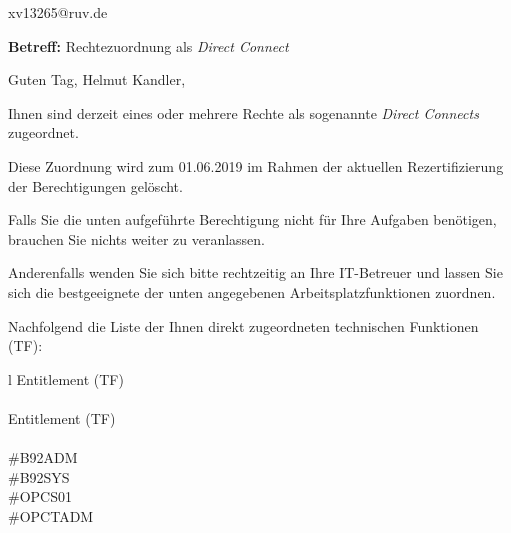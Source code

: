 \documentclass[a4paper,landscape,12pt]{letter}
\begin{document}
\begin{letter}{xv13265@ruv.de\hfill \break}
\begin{normalsize}
	\opening{\textbf{Betreff:} Rechtezuordnung als \emph{Direct Connect}}
	\begin{normalsize} \hfill
	\end{normalsize}

	\begin{normalsize}
		Guten Tag, 
	Helmut Kandler, \hfill \break
	\end{normalsize}
	\end{normalsize}
	
\begin{normalsize}
	Ihnen sind derzeit eines oder mehrere Rechte als sogenannte \emph{Direct Connects} zugeordnet.
	
	Diese Zuordnung wird zum 01.06.2019 im Rahmen der aktuellen Rezertifizierung der Berechtigungen gelöscht.
	
	Falls Sie die unten aufgeführte Berechtigung nicht für Ihre Aufgaben benötigen, 
	brauchen Sie nichts weiter zu veranlassen.
	
	Anderenfalls wenden Sie sich bitte rechtzeitig an Ihre IT-Betreuer 
	und lassen Sie sich die bestgeeignete der unten angegebenen Arbeitsplatzfunktionen zuordnen.
	\end{normalsize}
	
\begin{normalsize}
	Nachfolgend die Liste der Ihnen direkt zugeordneten technischen Funktionen (TF):

	\begin{longtable}{l}
		Entitlement (TF) \\ \hline
		\endfirsthead
		\\\hline
		Entitlement (TF) \\ \hline
		\endhead %
		\multicolumn{1}{r@{}}{Fortsetzung \ldots}\\
		\endfoot
		\hline
		\endlastfoot
	\#B92ADM\\\#B92SYS\\\#OPCS01\\\#OPCTADM\\
	\end{longtable}
	\end{normalsize}
	

\end{letter}
\end{document}
